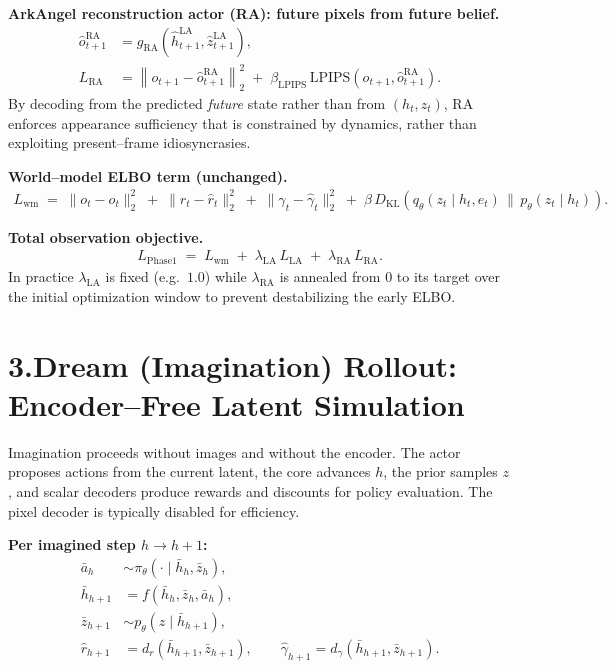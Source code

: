 \documentclass[11pt]{article}
\begin{document}
\textbf{ArkAngel reconstruction actor (RA): future pixels from future belief.}
\begin{align}
\hat o_{t+1}^{\mathrm{RA}} &= g_{\mathrm{RA}}\!\left(\hat h_{t+1}^{\mathrm{LA}}, \hat z_{t+1}^{\mathrm{LA}}\right), \label{eq:ra_pred}\\
L_{\mathrm{RA}} &= \left\| o_{t+1} - \hat o_{t+1}^{\mathrm{RA}} \right\|_2^2 \;+\; \beta_{\mathrm{LPIPS}}\,\mathrm{LPIPS}\!\left(o_{t+1}, \hat o_{t+1}^{\mathrm{RA}}\right). \label{eq:ra_loss}
\end{align}
By decoding from the predicted \emph{future} state rather than from $(h_t,z_t)$, RA enforces appearance sufficiency that is constrained by dynamics, rather than exploiting present--frame idiosyncrasies.

\textbf{World--model ELBO term (unchanged).}
\begin{align}
L_{\mathrm{wm}} \;=\; \|o_t-\hat o_t\|_2^2 \;+\; \|r_t-\hat r_t\|_2^2 \;+\; \|\gamma_t-\hat\gamma_t\|_2^2 \;+\; \beta\, D_{\mathrm{KL}}\!\left(q_\theta(z_t\!\mid h_t,e_t)\,\big\|\,p_\theta(z_t\!\mid h_t)\right). \label{eq:wm}
\end{align}

\textbf{Total observation objective.}
\begin{align}
\boxed{\,L_{\mathrm{Phase1}} \;=\; L_{\mathrm{wm}} \;+\; \lambda_{\mathrm{LA}}\,L_{\mathrm{LA}} \;+\; \lambda_{\mathrm{RA}}\,L_{\mathrm{RA}}.\,} \label{eq:phase1}
\end{align}
In practice $\lambda_{\mathrm{LA}}$ is fixed (e.g.\ $1.0$) while $\lambda_{\mathrm{RA}}$ is annealed from $0$ to its target over the initial optimization window to prevent destabilizing the early ELBO.

\section*{3.\quad Dream (Imagination) Rollout: Encoder--Free Latent Simulation}

Imagination proceeds without images and without the encoder. The actor proposes actions from the current latent, the core advances $h$, the prior samples $z$, and scalar decoders produce rewards and discounts for policy evaluation. The pixel decoder is typically disabled for efficiency.

\textbf{Per imagined step $h\!\to\!h{+}1$:}
\begin{align}
\bar a_h &\sim \pi_\theta(\cdot \mid \bar h_h, \bar z_h), \label{eq:actor}\\
\bar h_{h+1} &= f(\bar h_h, \bar z_h, \bar a_h), \label{eq:core_dream}\\
\bar z_{h+1} &\sim p_\theta(z \mid \bar h_{h+1}), \label{eq:prior_dream}\\
\hat r_{h+1} &= d_r(\bar h_{h+1}, \bar z_{h+1}), \qquad \hat\gamma_{h+1} = d_\gamma(\bar h_{h+1}, \bar z_{h+1}). \label{eq:scalars_dream}
\end{align}
\end{document}
